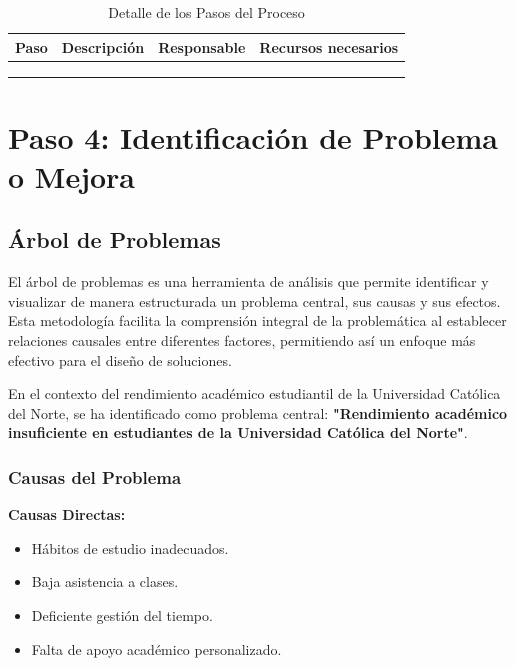 \documentclass[12pt,letterpaper]{report}
\begin{document}
\begin{table}[H]
    \centering
    \begin{tabularx}{\textwidth}{|X|X|X|X|}
        \hline
        \textbf{Paso} & \textbf{Descripción} & \textbf{Responsable} & \textbf{Recursos necesarios} \\
        \hline
        & & & \\
        \hline
        & & & \\
        \hline
        & & & \\
        \hline
    \end{tabularx}
    \caption{Detalle de los Pasos del Proceso}
\end{table}

\section{Paso 4: Identificación de Problema o Mejora}

\subsection{Árbol de Problemas}

El árbol de problemas es una herramienta de análisis que permite identificar y visualizar de manera estructurada un problema central, sus causas y sus efectos. Esta metodología facilita la comprensión integral de la problemática al establecer relaciones causales entre diferentes factores, permitiendo así un enfoque más efectivo para el diseño de soluciones.

En el contexto del rendimiento académico estudiantil de la Universidad Católica del Norte, se ha identificado como problema central: \textbf{"Rendimiento académico insuficiente en estudiantes de la Universidad Católica del Norte"}.

\subsubsection{Causas del Problema}

\textbf{Causas Directas:}
\begin{itemize}
    \item Hábitos de estudio inadecuados.
    \item Baja asistencia a clases.
    \item Deficiente gestión del tiempo.
    \item Falta de apoyo académico personalizado.
\end{itemize}
\end{document}

